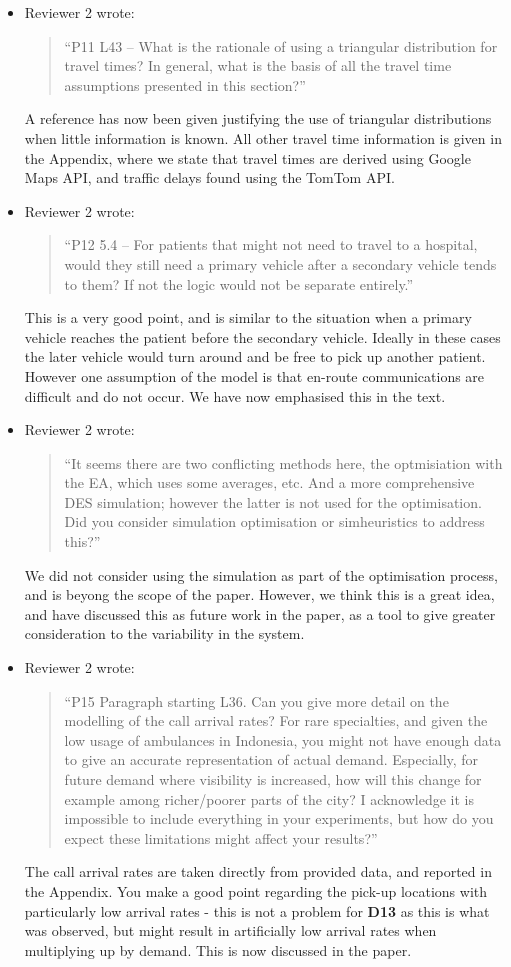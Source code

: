 \documentclass{article}
\begin{document}
\begin{itemize}
\item Reviewer 2 wrote:
\begin{quote}
``P11 L43 – What is the rationale of using a triangular distribution for travel times? In general, what is the basis of all the travel time assumptions presented in this section?''
\end{quote}
A reference has now been given justifying the use of triangular distributions when little information is known. All other travel time information is given in the Appendix, where we state that travel times are derived using Google Maps API, and traffic delays found using the TomTom API.

\item Reviewer 2 wrote:
\begin{quote}
``P12 5.4 – For patients that might not need to travel to a hospital, would they still need a primary vehicle after a secondary vehicle tends to them? If not the logic would not be separate entirely.''
\end{quote}
This is a very good point, and is similar to the situation when a primary vehicle reaches the patient before the secondary vehicle. Ideally in these cases the later vehicle would turn around and be free to pick up another patient. However one assumption of the model is that en-route communications are difficult and do not occur. We have now emphasised this in the text.

\item Reviewer 2 wrote:
\begin{quote}
``It seems there are two conflicting methods here, the optmisiation with the EA, which uses some averages, etc. And a more comprehensive DES simulation; however the latter is not used for the optimisation. Did you consider simulation optimisation or simheuristics to address this?''
\end{quote}
We did not consider using the simulation as part of the optimisation process, and is beyong the scope of the paper. However, we think this is a great idea, and have discussed this as future work in the paper, as a tool to give greater consideration to the variability in the system.

\item Reviewer 2 wrote:
\begin{quote}
``P15 Paragraph starting L36. Can you give more detail on the modelling of the call arrival rates? For rare specialties, and given the low usage of ambulances in Indonesia, you might not have enough data to give an accurate representation of actual demand. Especially, for future demand where visibility is increased, how will this change for example among richer/poorer parts of the city? I acknowledge it is impossible to include everything in your experiments, but how do you expect these limitations might affect your results?''
\end{quote}
The call arrival rates are taken directly from provided data, and reported in the Appendix. You make a good point regarding the pick-up locations with particularly low arrival rates - this is not a problem for \textbf{D13} as this is what was observed, but might result in artificially low arrival rates when multiplying up by demand. This is now discussed in the paper.


\end{itemize}
\end{document}
